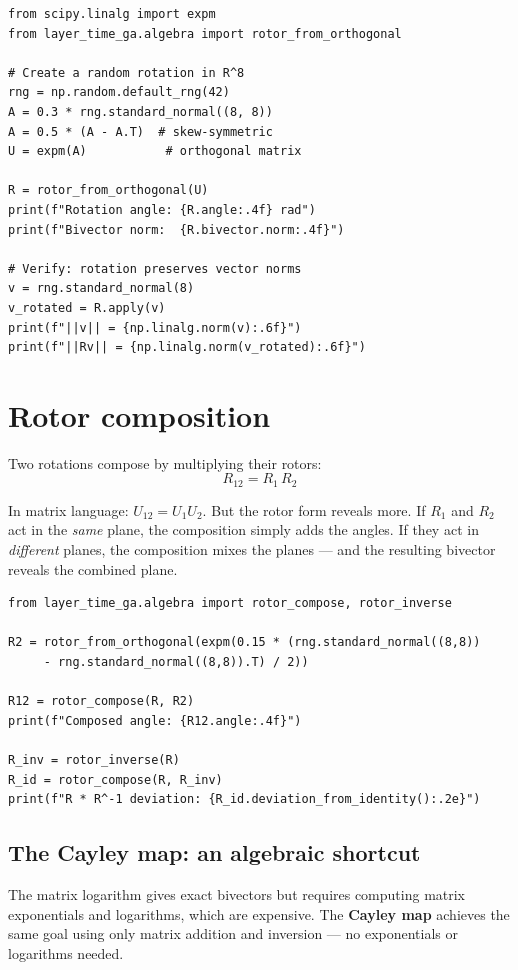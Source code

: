\documentclass[11pt, twoside, openright]{memoir}
\newcommand{\gp}{\,}              %
\begin{document}
\begin{lstlisting}[caption={From orthogonal matrix to rotor}]
from scipy.linalg import expm
from layer_time_ga.algebra import rotor_from_orthogonal

# Create a random rotation in R^8
rng = np.random.default_rng(42)
A = 0.3 * rng.standard_normal((8, 8))
A = 0.5 * (A - A.T)  # skew-symmetric
U = expm(A)           # orthogonal matrix

R = rotor_from_orthogonal(U)
print(f"Rotation angle: {R.angle:.4f} rad")
print(f"Bivector norm:  {R.bivector.norm:.4f}")

# Verify: rotation preserves vector norms
v = rng.standard_normal(8)
v_rotated = R.apply(v)
print(f"||v|| = {np.linalg.norm(v):.6f}")
print(f"||Rv|| = {np.linalg.norm(v_rotated):.6f}")
\end{lstlisting}

\section{Rotor composition}

Two rotations compose by multiplying their rotors:
\[
  R_{12} = R_1 \gp R_2
\]

In matrix language: $U_{12} = U_1 U_2$.  But the rotor form reveals
more.  If $R_1$ and $R_2$ act in the \emph{same} plane, the composition
simply adds the angles.  If they act in \emph{different} planes, the
composition mixes the planes --- and the resulting bivector reveals the
combined plane.

\begin{lstlisting}[caption={Composing and inverting rotors}]
from layer_time_ga.algebra import rotor_compose, rotor_inverse

R2 = rotor_from_orthogonal(expm(0.15 * (rng.standard_normal((8,8))
     - rng.standard_normal((8,8)).T) / 2))

R12 = rotor_compose(R, R2)
print(f"Composed angle: {R12.angle:.4f}")

R_inv = rotor_inverse(R)
R_id = rotor_compose(R, R_inv)
print(f"R * R^-1 deviation: {R_id.deviation_from_identity():.2e}")
\end{lstlisting}

\subsection*{The Cayley map: an algebraic shortcut}

The matrix logarithm gives exact bivectors but requires computing matrix
exponentials and logarithms, which are expensive.  The \textbf{Cayley map}
achieves the same goal using only matrix addition and inversion --- no
exponentials or logarithms needed.
\end{document}
